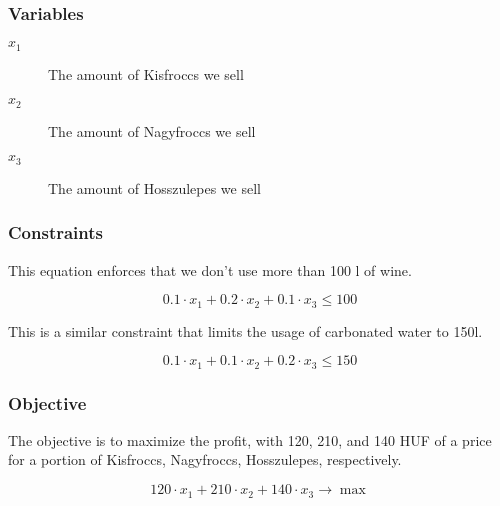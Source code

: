 \documentclass{article}
\begin{document}
    \subsubsection*{Variables}

    \begin{description}
        \item[$x_1$] The amount of Kisfroccs we sell
        \item[$x_2$] The amount of Nagyfroccs we sell
        \item[$x_3$] The amount of Hosszulepes we sell 
    \end{description}

    \subsubsection*{Constraints}

    This equation enforces that we don't use more than 100 l of wine.

    $$ 0.1 \cdot x_1 + 0.2 \cdot x_2 + 0.1 \cdot x_3 \le 100 $$

    This is a similar constraint that limits the usage of carbonated water to 150l.

    $$ 0.1 \cdot x_1 + 0.1 \cdot x_2 + 0.2 \cdot x_3 \le 150 $$

    \subsubsection*{Objective}

    The objective is to maximize the profit, with 120, 210, and 140 HUF of a price for a portion of Kisfroccs, Nagyfroccs, Hosszulepes, respectively.

    $$ 120\cdot x_1 + 210\cdot x_2 + 140\cdot x_3 \to \max $$
\end{document}
